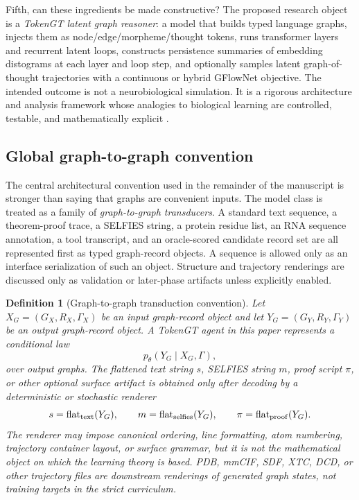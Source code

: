 \documentclass[11pt]{article}
\newtheorem{definition}{Definition}[section]
\newcommand{\1}{\mathbf{1}}
\begin{document}
Fifth, can these ingredients be made constructive? The proposed research object is a \emph{TokenGT latent graph reasoner}: a model that builds typed language graphs, injects them as node/edge/morpheme/thought tokens, runs transformer layers and recurrent latent loops, constructs persistence summaries of embedding distograms at each layer and loop step, and optionally samples latent graph-of-thought trajectories with a continuous or hybrid GFlowNet objective. The intended outcome is not a neurobiological simulation. It is a rigorous architecture and analysis framework whose analogies to biological learning are controlled, testable, and mathematically explicit \cite{BestaGoT2023,Lahlou2023,Younsi2025,GraphThoughtsSurvey2024}.

\subsection{Global graph-to-graph convention}

The central architectural convention used in the remainder of the manuscript is stronger than saying that graphs are convenient inputs. The model class is treated as a family of \emph{graph-to-graph transducers}. A standard text sequence, a theorem-proof trace, a SELFIES string, a protein residue list, an RNA sequence annotation, a tool transcript, and an oracle-scored candidate record set are all represented first as typed graph-record objects. A sequence is allowed only as an interface serialization of such an object. Structure and trajectory renderings are discussed only as validation or later-phase artifacts unless explicitly enabled.

\begin{definition}[Graph-to-graph transduction convention]
Let \(X_G=(G_X,R_X,\Gamma_X)\) be an input graph-record object and let \(Y_G=(G_Y,R_Y,\Gamma_Y)\) be an output graph-record object. A TokenGT agent in this paper represents a conditional law
\[
  p_\theta(Y_G\mid X_G,\Gamma),
\]
over output graphs. The flattened text string \(s\), SELFIES string \(m\), proof script \(\pi\), or other optional surface artifact is obtained only after decoding by a deterministic or stochastic renderer
\[
  s=\mathrm{flat}_{\rm text}(Y_G),\qquad
  m=\mathrm{flat}_{\rm selfies}(Y_G),\qquad
  \pi=\mathrm{flat}_{\rm proof}(Y_G).
\]
The renderer may impose canonical ordering, line formatting, atom numbering, trajectory container layout, or surface grammar, but it is not the mathematical object on which the learning theory is based. PDB, mmCIF, SDF, XTC, DCD, or other trajectory files are downstream renderings of generated graph states, not training targets in the strict curriculum.
\end{definition}
\end{document}
